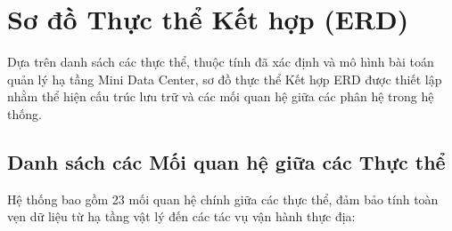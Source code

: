 \section{Sơ đồ Thực thể Kết hợp (ERD)}

Dựa trên danh sách các thực thể, thuộc tính đã xác định và mô hình bài toán quản lý hạ tầng Mini Data Center, sơ đồ thực thể Kết hợp ERD được thiết lập nhằm thể hiện cấu trúc lưu trữ và các mối quan hệ giữa các phân hệ trong hệ thống.

\subsection{Danh sách các Mối quan hệ giữa các Thực thể}

Hệ thống bao gồm 23 mối quan hệ chính giữa các thực thể, đảm bảo tính toàn vẹn dữ liệu từ hạ tầng vật lý đến các tác vụ vận hành thực địa:

